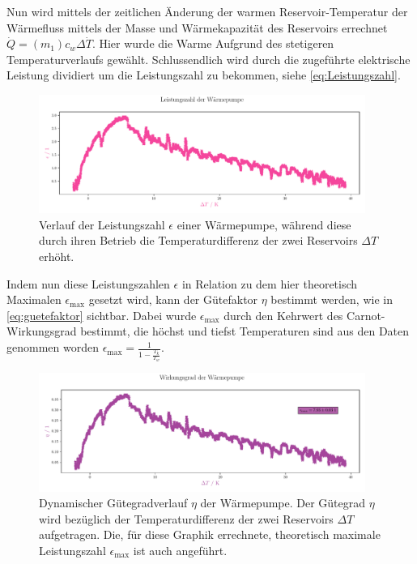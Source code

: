 \documentclass[12pt,english,ngerman]{scrartcl}
\begin{document}
Nun wird mittels der zeitlichen Änderung der warmen Reservoir-Temperatur der
Wärmefluss mittels der Masse und Wärmekapazität des Reservoirs errechnet
${\dot{Q}= (m_1) c_w \Delta \dot{T}}$. Hier wurde die Warme Aufgrund des
stetigeren Temperaturverlaufs gewählt. Schlussendlich wird durch die zugeführte
elektrische Leistung dividiert um die Leistungszahl zu bekommen, siehe
\autoref{eq:Leistungszahl}.

\begin{figure}[H]
	\centering
	\includegraphics[width=0.95\textwidth]{figures/leistungszahlVerlauf.pdf}
	\caption[Verlauf der Leistungszahl]{Verlauf der Leistungszahl $\epsilon$ einer
		Wärmepumpe, während diese durch ihren Betrieb die Temperaturdifferenz der zwei
		Reservoirs $\Delta T$ erhöht.
	}\label{fig:leistungszahlVerlauf}
\end{figure}

Indem nun diese Leistungszahlen $\epsilon$ in Relation zu dem hier theoretisch
Maximalen $\epsilon_\text{max}$ gesetzt wird, kann der Gütefaktor $\eta$
bestimmt werden, wie in \autoref{eq:guetefaktor} sichtbar. Dabei wurde
$\epsilon_\text{max}$ durch den Kehrwert des Carnot-Wirkungsgrad bestimmt, die
höchst und tiefst Temperaturen sind aus den Daten genommen worden
${\epsilon_\text{max} = \frac{1}{1-\frac{T_k}{T_w}}}$.

\begin{figure}[H]
	\centering
	\includegraphics[width=0.95\textwidth]{figures/wirkungsgradVerlauf.pdf}
	\caption[Dynamischer Gütegradverlauf $\eta$ der Wärmepumpe]{Dynamischer Gütegradverlauf
		$\eta$ der Wärmepumpe. Der Gütegrad $\eta$ wird bezüglich der
		Temperaturdifferenz der zwei Reservoirs $\Delta T$ aufgetragen. Die, für diese
		Graphik errechnete, theoretisch maximale Leistungszahl $\epsilon_\text{max}$
		ist auch angeführt.
	}\label{fig:wirkungsgradVerlauf}
\end{figure}
\end{document}
